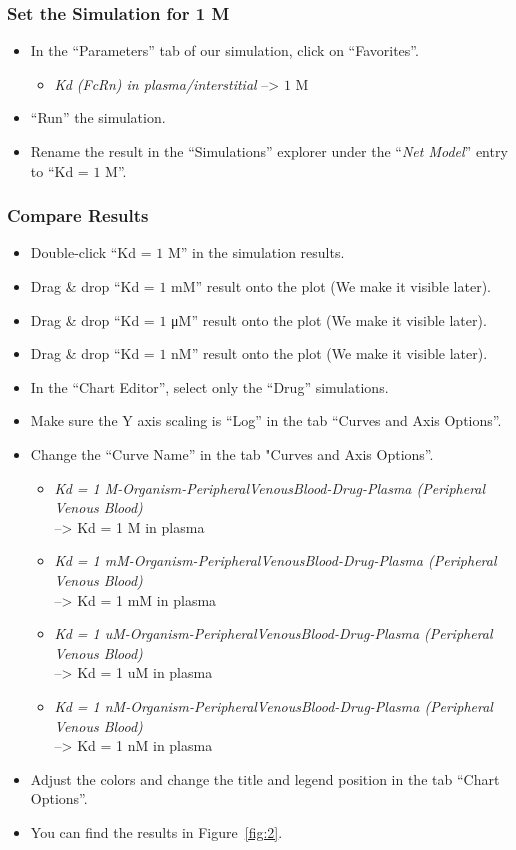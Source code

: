 \documentclass[fleqn,10pt]{physiome}
\begin{document}
\subsubsection{Set the Simulation for 1 M}
\begin{itemize}
    \item In the ``Parameters'' tab of our simulation, click on ``Favorites''.
    \begin{itemize}
        \item \textit{Kd (FcRn) in plasma/interstitial} --> $1$ M
    \end{itemize}
    \item ``Run'' the simulation.
    \item Rename the result in the ``Simulations'' explorer under the ``\textit{Net Model}'' entry to ``Kd = $1$ M''.
\end{itemize}

\subsubsection{Compare Results}
\begin{itemize}
    \item Double-click ``Kd = $1$ M'' in the simulation results.
    \item Drag \& drop ``Kd = $1$ mM'' result onto the plot (We make it visible later).
    \item Drag \& drop ``Kd = $1$ \si{\micro M}'' result onto the plot (We make it visible later).
    \item Drag \& drop ``Kd = $1$ nM'' result onto the plot (We make it visible later).
    \item In the ``Chart Editor'', select only the ``Drug'' simulations.
    \item Make sure the Y axis scaling is ``Log'' in the tab ``Curves and Axis Options''.
    \item Change the ``Curve Name'' in the tab "Curves and Axis Options''.
    \begin{itemize}
        \item \textit{Kd = 1 M-Organism-PeripheralVenousBlood-Drug-Plasma (Peripheral Venous Blood)} 
        \\--> Kd = 1 M in plasma
        \item \textit{Kd = 1 mM-Organism-PeripheralVenousBlood-Drug-Plasma (Peripheral Venous Blood)} 
        \\--> Kd = 1 mM in plasma
        \item \textit{Kd = 1 uM-Organism-PeripheralVenousBlood-Drug-Plasma (Peripheral Venous Blood)} 
        \\--> Kd = 1 uM in plasma
        \item \textit{Kd = 1 nM-Organism-PeripheralVenousBlood-Drug-Plasma (Peripheral Venous Blood)} 
        \\--> Kd = 1 nM in plasma
    \end{itemize}
    \item Adjust the colors and change the title and legend position in the tab ``Chart Options''.
    \item You can find the results in Figure~\ref{fig:2}.
\end{itemize}
\end{document}
